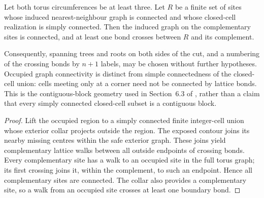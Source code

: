 \begin{lemma}%
    \label{thm:peps_torus_simply_connected_complement}
    \leanok
    Let both torus circumferences be at least three. Let $R$ be a finite
    set of sites whose induced nearest-neighbour graph is connected and
    whose closed-cell realization is simply connected. Then the
    induced graph on the complementary sites is connected, and at least
    one bond crosses between $R$ and its complement.

    Consequently, spanning trees and roots on both sides of the cut,
    and a numbering of the crossing bonds by $n+1$ labels, may be chosen
    without further hypotheses. Occupied graph connectivity is distinct
    from simple connectedness of the closed-cell union: cells meeting
    only at a corner need not be connected by lattice bonds. This is the
    contiguous-block geometry used in Section~6.3 of
    \cite{Schuch2010PEPS}, rather than a claim that every simply connected
    closed-cell subset is a contiguous block.
\end{lemma}

\begin{proof}\leanok
    Lift the occupied region to a simply connected finite integer-cell
    union whose exterior collar projects outside the region. The exposed
    contour joins its nearby missing centres within the safe exterior
    graph. These joins yield complementary lattice walks between all
    outside endpoints of crossing bonds. Every complementary site has
    a walk to an occupied site in the full torus graph; its first crossing
    joins it, within the complement, to such an endpoint. Hence all
    complementary sites are connected. The collar also provides a
    complementary site, so a walk from an occupied site crosses at least
    one boundary bond.
\end{proof}
